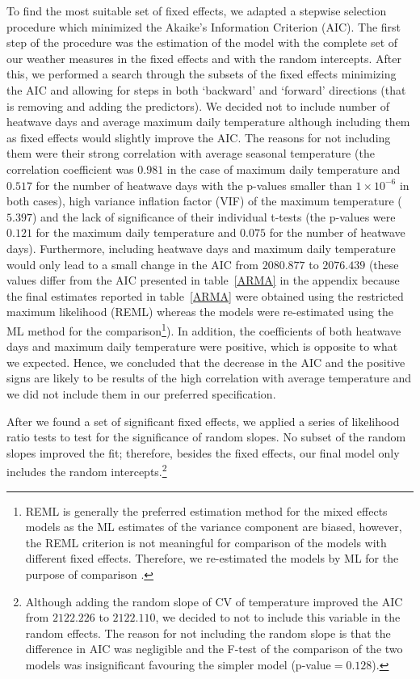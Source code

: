 \documentclass[12pt]{iopart}
\begin{document}
To find the most suitable set of fixed effects, we adapted a stepwise selection procedure which minimized the Akaike's Information Criterion (AIC). The first step of the procedure was the estimation of the model with the complete set of our weather measures in the fixed effects and with the random intercepts. After this, we performed a search through the subsets of the fixed effects minimizing the AIC and allowing for steps in both `backward' and `forward' directions (that is removing and adding the predictors). We decided not to include number of heatwave days and average maximum daily temperature although including them as fixed effects would slightly improve the AIC. The reasons for not including them were their strong correlation with average seasonal temperature (the correlation coefficient was $0.981$ in the case of maximum daily temperature and $0.517$ for the number of heatwave days with the p-values smaller than $1\times10^{-6}$ in both cases), high variance inflation factor (VIF) of the maximum temperature ($5.397$) and the lack of significance of their individual t-tests (the p-values were $0.121$ for the maximum daily temperature and $0.075$ for the number of heatwave days). Furthermore, including heatwave days and maximum daily temperature would only lead to a small change in the AIC from $2080.877$ to $2076.439$ (these values differ from the AIC presented in table~\ref{ARMA} in the appendix because the final estimates reported in table~\ref{ARMA} were obtained using the restricted maximum likelihood (REML) whereas the models were re-estimated using the ML method for the comparison\footnote{REML is generally the preferred estimation method for the mixed effects models as the ML estimates of the variance component are biased, however, the REML criterion is not meaningful for comparison of the models with different fixed effects. Therefore, we re-estimated the models by ML for the purpose of comparison \cite{Zuur2009}.}). In addition, the coefficients of both heatwave days and maximum daily temperature were positive, which is opposite to what we expected. Hence, we concluded that the decrease in the AIC and the positive signs are likely to be results of the high correlation with average temperature and we did not include them in our preferred specification.

After we found a set of significant fixed effects, we applied a series of likelihood ratio tests to test for the significance of random slopes. No subset of the random slopes improved the fit; therefore, besides the fixed effects, our final model only includes the random intercepts.\footnote{Although adding the random slope of CV of temperature improved the AIC from $2122.226$ to $2122.110$, we decided to not to include this variable in the random effects. The reason for not including the random slope is that the difference in AIC was negligible and the F-test of the comparison of the two models was insignificant favouring the simpler model (p-value$=0.128$).} 
\end{document}
